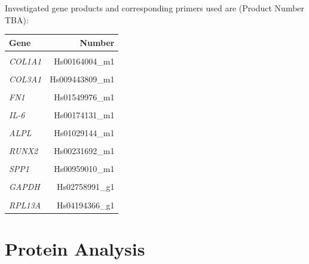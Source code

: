 Investigated gene products and corresponding primers used are (Product Number TBA): 

\begin{tabular}{lr}
	Gene & Number \\ 
	\hline 
	\rule[-1ex]{0pt}{4ex}  &  \\ 
	\textit{COL1A1} & Hs00164004\_m1 \\ 
	\hline 
	\rule[-1ex]{0pt}{2.5ex}  &  \\ 
	\textit{COL3A1} & Hs009443809\_m1 \\ 
	\hline 
	\rule[-1ex]{0pt}{2.5ex}  &  \\ 
	\textit{FN1} & Hs01549976\_m1 \\ 
	\hline 
	\rule[-1ex]{0pt}{2.5ex}  &  \\ 
	\textit{IL-6} & Hs00174131\_m1 \\ 
	\hline 
	\rule[-1ex]{0pt}{2.5ex}  &  \\ 
	\textit{ALPL} & Hs01029144\_m1 \\ 
	\hline 
	\rule[-1ex]{0pt}{2.5ex}  &  \\ 
	\textit{RUNX2} & Hs00231692\_m1 \\ 
	\hline 
	\rule[-1ex]{0pt}{2.5ex}  &  \\ 
	\textit{SPP1} & Hs00959010\_m1 \\ 
	\hline 
	\rule[-1ex]{0pt}{2.5ex}  &  \\ 
	\textit{GAPDH} & Hs02758991\_g1 \\ 
	\hline 
	\rule[-1ex]{0pt}{2.5ex}  &  \\ 
	\textit{RPL13A} & Hs04194366\_g1 \\ 
\end{tabular} 


\section{Protein Analysis}
